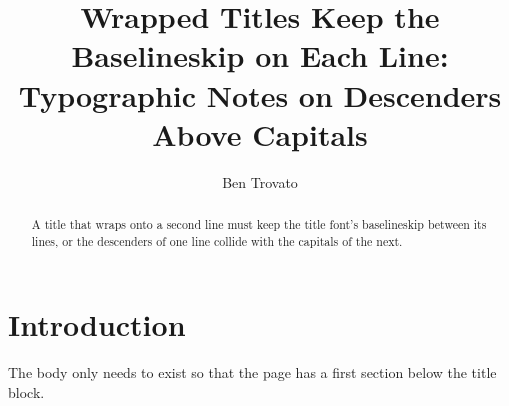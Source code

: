 \documentclass[sigplan]{acmart}
\begin{document}
\title{Wrapped Titles Keep the Baselineskip on Each Line: Typographic Notes on Descenders Above Capitals}

\author{Ben Trovato}

\begin{abstract}
  A title that wraps onto a second line must keep the title font's baselineskip between its lines, or the descenders of one line collide with the capitals of the next.
\end{abstract}

\maketitle

\section{Introduction}
The body only needs to exist so that the page has a first section below the title block.
\end{document}
